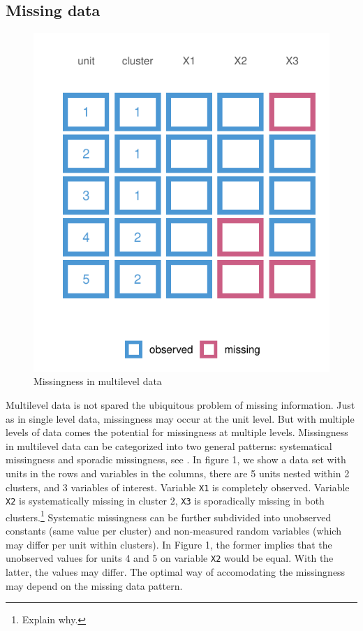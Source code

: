 \documentclass[
]{jss}
\begin{document}
\hypertarget{missing-data}{%
\subsection{Missing data}\label{missing-data}}

\begin{CodeChunk}
\begin{figure}

{\centering \includegraphics{Manuscript_files/figure-latex/patterns-1} 

}

\caption[Missingness in multilevel data]{Missingness in multilevel data}\label{fig:patterns}
\end{figure}
\end{CodeChunk}

Multilevel data is not spared the ubiquitous problem of missing
information. Just as in single level data, missingness may occur at the
unit level. But with multiple levels of data comes the potential for
missingness at multiple levels. Missingness in multilevel data can be
categorized into two general patterns: systematical missingness and
sporadic missingness, see \citet{resc13}. In figure 1, we show a data
set with units in the rows and variables in the columns, there are 5
units nested within 2 clusters, and 3 variables of interest. Variable
\texttt{X1} is completely observed. Variable \texttt{X2} is
systematically missing in cluster 2, \texttt{X3} is sporadically missing
in both clusters.\footnote{Explain why.} Systematic missingness can be
further subdivided into unobserved constants (same value per cluster)
and non-measured random variables (which may differ per unit within
clusters). In Figure 1, the former implies that the unobserved values
for units 4 and 5 on variable \texttt{X2} would be equal. With the
latter, the values may differ. The optimal way of accomodating the
missingness may depend on the missing data pattern.
\end{document}
